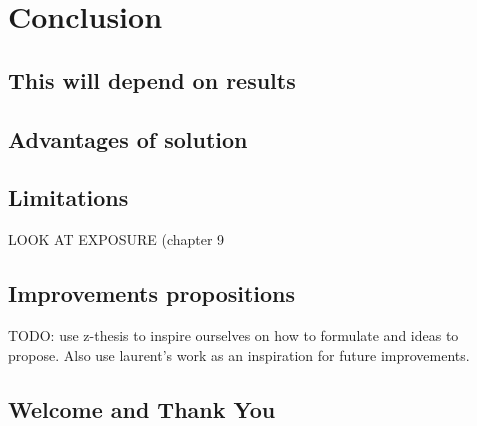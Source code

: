 
\chapter{Conclusion} %

\label{Conclusion} %

\section{This will depend on results}
\section{Advantages of solution}
\section{Limitations}
LOOK AT EXPOSURE (chapter 9
\section{Improvements propositions}
TODO: use z-thesis to inspire ourselves on how to formulate and ideas to propose.
Also use laurent's work as an inspiration for future improvements.
\section{Welcome and Thank You}

